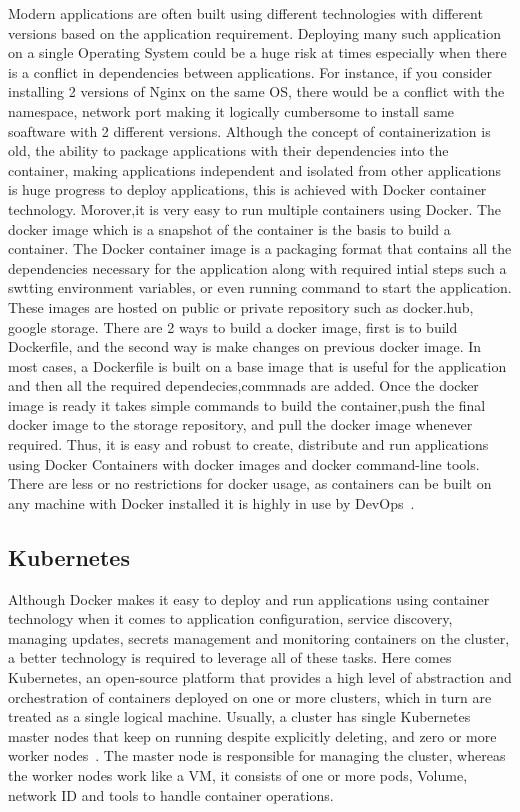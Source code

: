 Modern applications are often built using different technologies with
different versions based on the application requirement. Deploying
many such application on a single Operating System could be a huge
risk at times especially when there is a conflict in dependencies
between applications. For instance, if you consider installing 2
versions of Nginx on the same OS, there would be a conflict with the
namespace, network port making it logically cumbersome to install same
soaftware with 2 different versions. Although the concept of
containerization is old, the ability to package applications with
their dependencies into the container, making applications independent
and isolated from other applications is huge progress to deploy
applications, this is achieved with Docker container
technology. Morover,it is very easy to run multiple containers using
Docker. The docker image which is a snapshot of the container is the
basis to build a container. The Docker container image is a packaging
format that contains all the dependencies necessary for the
application along with required intial steps such a swtting
environment variables, or even running command to start the
application. These images are hosted on public or private repository
such as docker.hub, google storage.  There are 2 ways to build a
docker image, first is to build Dockerfile, and the second way is make
changes on previous docker image. In most cases, a Dockerfile is built
on a base image that is useful for the application and then all the
required dependecies,commnads are added. Once the docker image is
ready it takes simple commands to build the container,push the final
docker image to the storage repository, and pull the docker image
whenever required. Thus, it is easy and robust to create, distribute
and run applications using Docker Containers with docker images and
docker command-line tools. There are less or no restrictions for
docker usage, as containers can be built on any machine with Docker
installed it is highly in use by DevOps~\cite{hid-sp18-602-docker}.

\subsection{Kubernetes}

Although Docker makes it easy to deploy and run applications using
container technology when it comes to application configuration,
service discovery, managing updates, secrets management and monitoring
containers on the cluster, a better technology is required to leverage
all of these tasks. Here comes Kubernetes, an open-source platform
that provides a high level of abstraction and orchestration of
containers deployed on one or more clusters, which in turn are treated
as a single logical machine. Usually, a cluster has single Kubernetes
master nodes that keep on running despite explicitly deleting, and
zero or more worker nodes~\cite{hid-sp18-602-kubernetes}. The master
node is responsible for managing the cluster, whereas the worker nodes
work like a VM, it consists of one or more pods, Volume, network ID
and tools to handle container operations.

